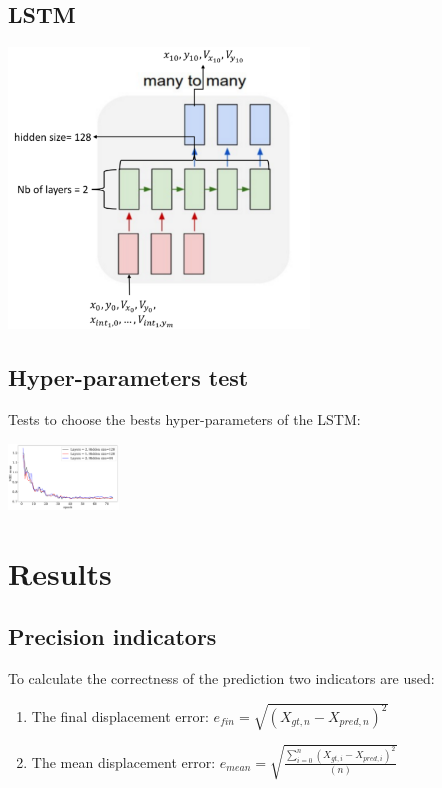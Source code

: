 \documentclass[a0,portrait]{a0poster}
\begin{document}
\begin{multicols}{2}
\begin{minipage}[]{0.5\linewidth}
\subsection*{LSTM}

\centerline {\includegraphics[width=0.6\textwidth]{figure/manytomany}}
\end{minipage}


\subsection*{Hyper-parameters test}
Tests to choose the bests hyper-parameters of the LSTM:\\
\centerline {\includegraphics[width=0.22\textwidth]{figure/hyperparam}}


\section*{Results}
\subsection*{Precision indicators}
To calculate the correctness of the prediction two indicators are used:
\begin{enumerate}
\justifying
\item The final displacement error: $e_{fin} = \sqrt{(X_{gt,n}-X_{pred,n})^2}$
\item The mean displacement error: $e_{mean} = \sqrt{\frac{\sum_{i=0}^n(X_{gt,i}-X_{pred,i})^2}{(n)}}$
\end{enumerate}


\end{multicols}
\end{document}
